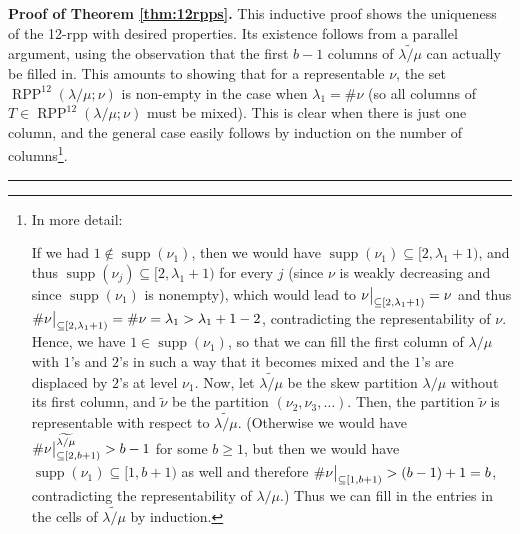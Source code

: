 \documentclass[numbers=enddot,12pt,final,onecolumn,notitlepage]{scrartcl}%
\theoremstyle{definition}
\newenvironment{proof}[1][Proof]{\noindent\textbf{#1.} }{\ \rule{0.5em}{0.5em}}
\def\seplistvar{{{\nu}}} %
\def\supp{{\operatorname{supp}}}
\def\lm{{\lambda/\mu}}
\def\OneTwoRPPCutvar{{\operatorname{RPP}^{12}\left(  \lambda/\mu ;\seplistvar \right)}}
\begin{document}
\begin{proof}[Proof of Theorem \ref{thm:12rpps}]
This inductive proof shows the uniqueness of the 12-rpp with desired properties. Its existence follows from a parallel argument, using the observation that the first $b-1$ columns of $\widetilde{\lm}$ can actually be filled in. This amounts to showing that for a representable $\seplistvar$, the set $\OneTwoRPPCutvar$ is non-empty in the case when $\lambda_1 = \#\seplistvar$ (so all columns of $T \in \OneTwoRPPCutvar$ must be mixed). This is clear when there is just one column, and the general case easily follows by induction on the number of columns\footnote{In more detail: \par
If we had $1 \notin \supp(\seplistvar_1)$, then we would have $\supp(\seplistvar_1) \subseteq [2, \lambda_1+1)$, and thus $\supp(\seplistvar_j) \subseteq [2, \lambda_1+1)$ for every $j$ (since $\seplistvar$ is weakly decreasing and since $\supp(\seplistvar_1)$ is nonempty), which would lead to $\nuxy{2}{\lambda_1+1} = \seplistvar$ and thus $\#\nuxy{2}{\lambda_1+1} = \#\seplistvar = \lambda_1 > \lambda_1 + 1 - 2$, contradicting the representability of $\seplistvar$. Hence, we have $1 \in \supp(\seplistvar_1)$, so that we can fill the first column of $\lm$ with $1$'s and $2$'s in such a way that it becomes mixed and the $1$'s are displaced by $2$'s at level $\seplistvar_1$. Now, let $\widetilde{\lm}$ be the skew partition $\lm$ without its first column, and $\widetilde{\seplistvar}$ be the partition $\left(\seplistvar_2, \seplistvar_3, \ldots\right)$. Then, the partition $\widetilde{\seplistvar}$ is representable with respect to $\widetilde{\lm}$. (Otherwise we would have $\#\nuxy{2}{b+1}^{\widetilde{\lm}}>b-1$ for some $b \geq 1$, but then we would have $\supp(\seplistvar_1) \subseteq [1,b+1)$ as well and therefore $\#\nuxy{1}{b+1}>(b-1)+1=b$, contradicting the representability of $\lm$.) Thus we can fill in the entries in the cells of $\widetilde{\lm}$ by induction.}.
\end{proof}
\end{document}
